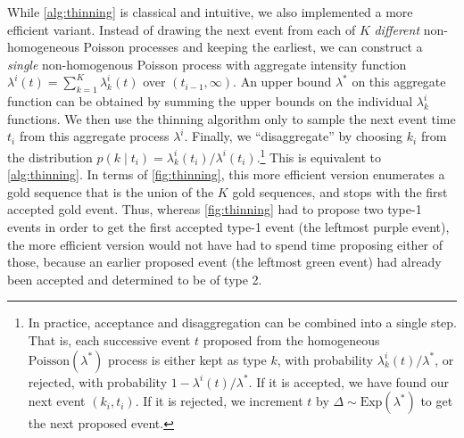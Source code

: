 \documentclass{article}
\begin{document}
While \cref{alg:thinning} is classical and intuitive, we also implemented a more efficient variant.  Instead of drawing the next event from each of $K$ {\em different} non-homogeneous Poisson processes and keeping the earliest, we can construct a {\em single} non-homogenous Poisson process with aggregate intensity function $\lambda^i(t)=\sum_{k=1}^{K} \lambda^i_{k}(t)$ over $(t_{i-1},\infty)$.  An upper bound $\lambda^*$ on this aggregate function can be obtained by summing the upper bounds on the individual $\lambda^i_k$ functions.  We then use the thinning algorithm only to sample the next event time $t_i$ from this aggregate process $\lambda^i$.  Finally, we ``disaggregate'' by choosing $k_i$ from the distribution $p(k \mid t_i) = \lambda_{k}^i(t_i)/\lambda^i(t_i)$.\footnote{In practice, acceptance and disaggregation can be combined into a single step.  That is, each successive event $t$ proposed from the homogeneous $\text{Poisson}(\lambda^*)$ process is either kept as type $k$, with probability
  $\lambda_{k}^i(t)/\lambda^*$, or rejected, with probability $1 - \lambda^i(t)/\lambda^*$.
  If it is accepted, we have found our next event $(k_i,t_i)$.  If it is rejected, we increment $t$ by $\Delta \sim \text{Exp}(\lambda^*)$ to get the next proposed event.}
  This is equivalent to \cref{alg:thinning}.  In terms of \cref{fig:thinning}, this more efficient version enumerates a gold sequence that is the union of the $K$ gold sequences, and stops with the first accepted gold event.  Thus, whereas \cref{fig:thinning} had to propose two type-1 events in order to get the first accepted type-1 event (the leftmost purple event), the more efficient version would not have had to spend time proposing either of those, because an earlier proposed event (the leftmost green event) had already been accepted and determined to be of type 2.
\end{document}
